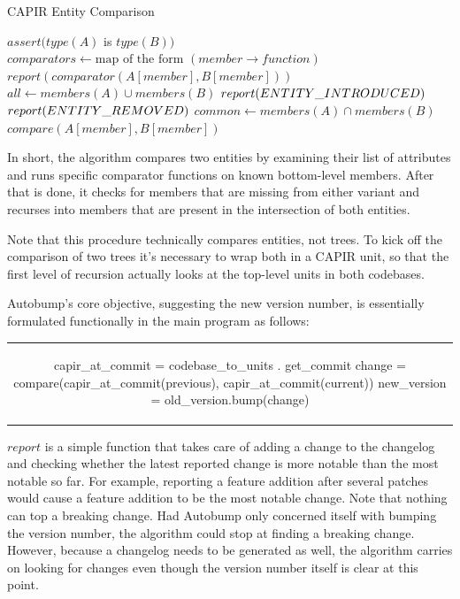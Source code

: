 \documentclass{l4proj}
\begin{document}
\begin{algorithm}
\caption{CAPIR Entity Comparison}
\begin{algorithmic}[1]
\State $assert(type(A)$ is $type(B))$
\State $comparators \gets \text{map of the form }(member \rightarrow function)$
$report(comparator(A[member], B[member]))$
\EndIf
\EndFor
\State $all \gets members(A) \cup members(B)$
$report(\detokenize{ENTITY_INTRODUCED})$
\EndIf
{}
$report(\detokenize{ENTITY_REMOVED})$
\EndIf
\EndFor
\State $common \gets members(A) \cap members(B)$
$compare(A[member], B[member])$
\EndFor
\EndProcedure
\end{algorithmic}
\end{algorithm}

In short, the algorithm compares two entities by examining their list
of attributes and runs specific comparator functions on known
bottom-level members. After that is done, it checks for members that
are missing from either variant and recurses into members that are
present in the intersection of both entities.

Note that this procedure technically compares entities, not trees. To
kick off the comparison of two trees it's necessary to wrap both in a
CAPIR unit, so that the first level of recursion actually looks at the
top-level units in both codebases.

Autobump's core objective, suggesting the new version number, is
essentially formulated functionally in the main program as follows:

\begin{center}
\begin{tabular}{c}
\begin{python}
capir_at_commit = codebase_to_units . get_commit
change = compare(capir_at_commit(previous), capir_at_commit(current))
new_version = old_version.bump(change)
\end{python}
\end{tabular}
\end{center}

$report$ is a simple function that takes care of adding a change to
the changelog and checking whether the latest reported change is more
notable than the most notable so far. For example, reporting a feature
addition after several patches would cause a feature addition to be
the most notable change. Note that nothing can top a breaking change.
Had Autobump only concerned itself with bumping the version number,
the algorithm could stop at finding a breaking change. However,
because a changelog needs to be generated as well, the algorithm
carries on looking for changes even though the version number itself
is clear at this point.
\end{document}
